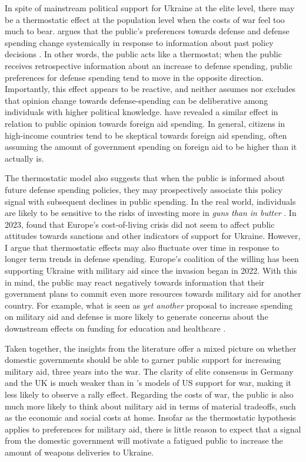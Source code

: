 In spite of mainstream political support for Ukraine at the elite level, there may be a thermostatic effect at the population level when the costs of war feel too much to bear. \textcite{wlezien_public_1995} argues that the public's preferences towards defense and defense spending change systemically in response to information about past policy decisions \autocite{wlezien_public_1995}. In other words, the public acts like a thermostat; when the public receives retrospective information about an increase to defense spending, public preferences for defense spending tend to move in the opposite direction. Importantly, this effect appears to be reactive, and neither assumes nor excludes that opinion change towards defense-spending can be deliberative among individuals with higher political knowledge. \textcite{scotto_we_2017} have revealed a similar effect in relation to public opinion towards foreign aid spending. In general, citizens in high-income countries tend to be skeptical towards foreign aid spending, often assuming the amount of government spending on foreign aid to be higher than it actually is.

The thermostatic model also suggests that when the public is informed about future defense spending policies, they may prospectively associate this policy signal with subsequent declines in public spending. In the real world, individuals are likely to be sensitive to the risks of investing more in \emph{guns than in butter} \autocite{powell_guns_1993, bove_political_2016, carrubba_decision_2004}. In 2023, \textcite{thomson_european_2023} found that Europe's cost-of-living crisis did not seem to affect public attitudes towards sanctions and other indicators of support for Ukraine. However, I argue that thermostatic effects may also fluctuate over time in response to longer term trends in defense spending. Europe's coalition of the willing has been supporting Ukraine with military aid since the invasion began in 2022. With this in mind, the public may react negatively towards information that their government plans to commit even more resources towards military aid for another country. For example, what is seen as \textit{yet another} proposal to increase spending on military aid and defense is more likely to generate concerns about the downstream effects on funding for education and healthcare \autocite{mintz_guns_1991}. 

Taken together, the insights from the literature offer a mixed picture on whether domestic governments should be able to garner public support for increasing military aid, three years into the war. The clarity of elite consensus in Germany and the UK is much weaker than in \textcite{berinsky_assuming_2007}'s models of US support for war, making it less likely to observe a rally effect. Regarding the costs of war, the public is also much more likely to think about military aid in terms of material tradeoffs, such as the economic and social costs at home. Insofar as the thermostatic hypothesis applies to preferences for military aid, there is little reason to expect that a signal from the domestic government will motivate a fatigued public to increase the amount of weapons deliveries to Ukraine. 

